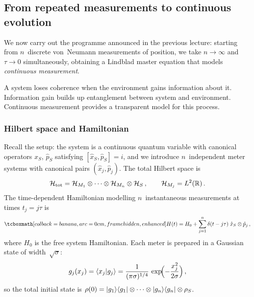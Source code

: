 

\subsection{From repeated measurements to continuous evolution}%
\label{sec:repeated-to-continuous}

We now carry out the programme announced in the previous lecture:
starting from $n$~discrete von~Neumann measurements of position, we
take $n \to \infty$ and $\tau \to 0$ simultaneously, obtaining a
Lindblad master equation that models \emph{continuous measurement}.

\begin{intuition}
  A system loses coherence when the environment gains information
  about it.  Information gain builds up entanglement between system
  and environment.  Continuous measurement provides a transparent
  model for this process.
\end{intuition}

\subsubsection{Hilbert space and Hamiltonian}

Recall the setup: the system is a continuous quantum variable with
canonical operators $\hat{x}_S$, $\hat{p}_S$ satisfying
$[\hat{x}_S, \hat{p}_S] = i$, and we introduce $n$~independent
meter systems with canonical pairs $(\hat{x}_j, \hat{p}_j)$.
The total Hilbert space is
\begin{equation}\label{eq:cm-hilb}
  \mathcal{H}_{\mathrm{tot}}
  = \mathcal{H}_{M_1} \otimes \cdots \otimes \mathcal{H}_{M_n} \otimes \mathcal{H}_S\,,
  \qquad \mathcal{H}_{M_j} = L^2(\mathbb{R})\,.
\end{equation}
The time-dependent Hamiltonian modelling $n$~instantaneous
measurements at times $t_j = j\tau$ is
\begin{equation}\label{eq:cm-hamiltonian}
  \eqbox{H(t) = H_0
  + \sum_{j=1}^{n} \delta(t - j\tau)\;\hat{x}_S \tp \hat{p}_j}\,,
\end{equation}
where $H_0$ is the free system Hamiltonian.
Each meter is prepared in a Gaussian state of width~$\sqrt{\sigma}$:
\begin{equation}\label{eq:meter-gaussian}
  g_j(x_j) = \langle x_j | g_j \rangle
  = \frac{1}{(\pi\sigma)^{1/4}}\,
    \exp\!\Bigl(-\frac{x_j^2}{2\sigma}\Bigr)\,,
\end{equation}
so the total initial state is
$\rho(0) = \lvert g_1 \rangle\langle g_1 \rvert \otimes \cdots \otimes \lvert g_n \rangle\langle g_n \rvert
\otimes \rho_S$.

